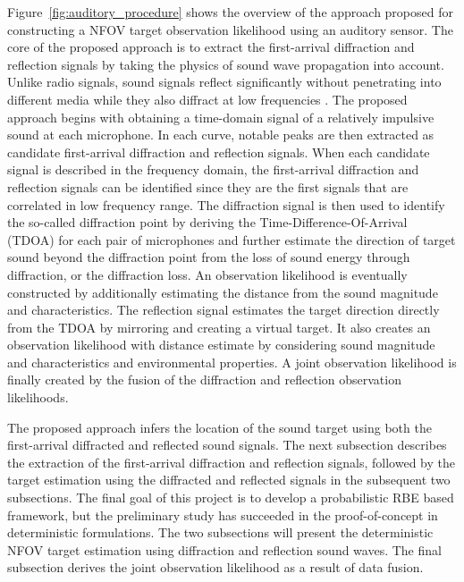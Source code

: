\documentclass[letterpaper, 10 pt, conference]{ieeeconf}  %
\begin{document}
Figure~\ref{fig:auditory_procedure} shows the overview of the approach proposed for constructing a NFOV target observation likelihood using an auditory sensor.  The core of the proposed approach is to extract the first-arrival diffraction and reflection signals by taking the physics of sound wave propagation into account.  Unlike radio signals, sound signals reflect significantly without penetrating into different media while they also diffract at low frequencies \cite{bellusci2007ultra}.  The proposed approach begins with obtaining a time-domain signal of a relatively impulsive sound at each microphone.  In each curve, notable peaks are then extracted as candidate first-arrival diffraction and reflection signals.  When each candidate signal is described in the frequency domain, the first-arrival diffraction and reflection signals can be identified since they are the first signals that are correlated in low frequency range.  The diffraction signal is then used to identify the so-called diffraction point by deriving the Time-Difference-Of-Arrival (TDOA) for each pair of microphones and further estimate the direction of target sound beyond the diffraction point from the loss of sound energy through diffraction, or the diffraction loss.  An observation likelihood is eventually constructed by additionally estimating the distance from the sound magnitude and characteristics.  The reflection signal estimates the target direction directly from the TDOA by mirroring and creating a virtual target.  It also creates an observation likelihood with distance estimate by considering sound magnitude and characteristics and environmental properties.  A joint observation likelihood is finally created by the fusion of the diffraction and reflection observation likelihoods.  


The proposed approach infers the location of the sound target using both the first-arrival diffracted and reflected sound signals.  The next subsection describes the extraction of the first-arrival diffraction and reflection signals, followed by the target estimation using the diffracted and reflected signals in the subsequent two subsections.  The final goal of this project is to develop a probabilistic RBE based framework, but the preliminary study has succeeded in the proof-of-concept in deterministic formulations.  The two subsections will present the deterministic NFOV target estimation using diffraction and reflection sound waves.  The final subsection derives the joint observation likelihood as a result of data fusion.  
\end{document}
